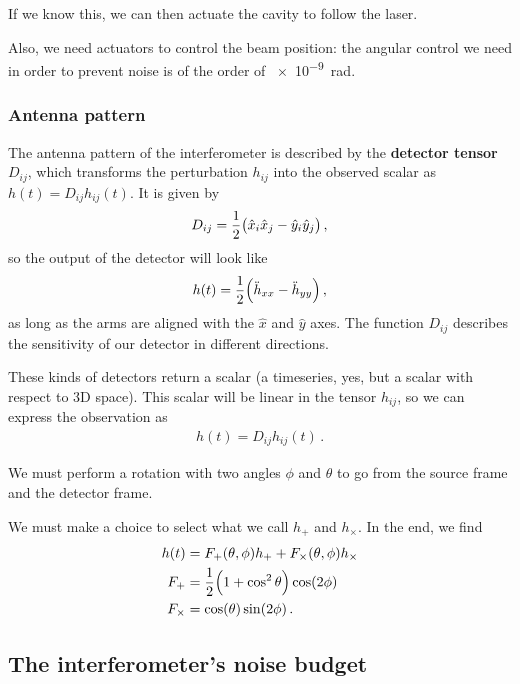 \documentclass[main.tex]{subfiles}
\begin{document}
If we know this, we can then actuate the cavity to follow the laser. 

Also, we need actuators to control the beam position: the angular control we need in order to prevent noise is of the order of \SI{e-9}{rad}.

\subsubsection{Antenna pattern}

The antenna pattern of the interferometer is described by the \textbf{detector tensor} \(D_{ij}\), which transforms the perturbation \(h_{ij}\) into the observed scalar as \(h (t) = D_{ij} h_{ij}(t)\). It is given by 
%
\begin{align}
D_{ij} = \frac{1}{2} \qty(\hat{x}_{i} \hat{x}_{j} - \hat{y}_{i} \hat{y}_{j}) 
\,,
\end{align}
%
so the output of the detector will look like
%
\begin{align}
h(t) = \frac{1}{2} \qty(\ddot{h}_{xx} - \ddot{h}_{yy})
\,,
\end{align}
%
as long as the arms are aligned with the \(\hat{x}\) and \(\hat{y}\) axes. 
The function \(D_{ij}\) describes the sensitivity of our detector in different directions. 

These kinds of detectors return a scalar (a timeseries, yes, but a scalar with respect to 3D space). This scalar will be linear in the tensor \(h_{ij}\), so we can express the observation as 
%
\begin{align}
h(t) = D_{ij} h_{ij} (t)
\,.
\end{align}

We must perform a rotation with two angles \(\phi \) and \(\theta \) to go from the source frame and the detector frame. 

We must make a choice to select what we call \(h_{+}\) and \(h_{ \times }\). In the end, we find 
%
\begin{subequations}
\begin{align}
h(t) &= F_{+} (\theta , \phi ) h_{+}+ F_{\times} (\theta , \phi ) h_{\times}  \\
F_{+} &= \frac{1}{2} \qty(1 + \cos^2\theta ) \cos( 2 \phi )  \\
F_{ \times } &= \cos(\theta ) \sin(2 \phi )
\,.
\end{align}
\end{subequations}

\subsection{The interferometer's noise budget}
\end{document}
